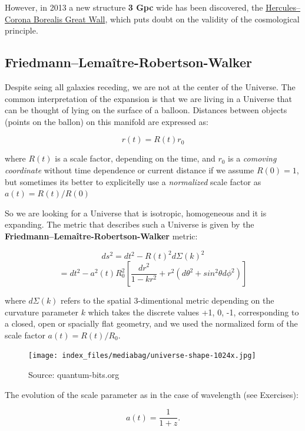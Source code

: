 \documentclass[
  letterpaper,
  DIV=11,
  numbers=noendperiod]{scrreprt}
\begin{document}
However, in 2013 a new structure \textbf{3 Gpc} wide has been
discovered, the \href{http://arxiv.org/abs/1311.1104}{Hercules--Corona
Borealis Great Wall}, which puts doubt on the validity of the
cosmological principle.

\subsection{Friedmann--Lemaître-Robertson-Walker}\label{friedmannlemauxeetre-robertson-walker}

Despite seing all galaxies receding, we are not at the center of the
Universe. The common interpretation of the expansion is that we are
living in a Universe that can be thought of lying on the surface of a
balloon. Distances between objects (points on the ballon) on this
manifold are expressed as:

\[r(t) = R(t)r_0\]

where \(R(t)\) is a scale factor, depending on the time, and \(r_0\) is
a \emph{comoving coordinate} without time dependence or current distance
if we assume \(R(0) = 1\), but sometimes its better to explicitelly use
a \emph{normalized} scale factor as \(a(t) = R(t)/R(0)\)

So we are looking for a Universe that is isotropic, homogeneous and it
is expanding. The metric that describes such a Universe is given by the
\textbf{Friedmann--Lemaître-Robertson-Walker} metric:

\[ds^2 = dt^2 - R(t)^2 d \Sigma(k)^2 \]
\[= dt^2 - a^2(t)R^2_0\left[\frac{dr^2}{1 - kr^2} + r^2(d\theta^2  + sin^2\theta d\phi^2)\right]\]

where \(d\Sigma(k)\) refers to the spatial 3-dimentional metric
depending on the curvature parameter \(k\) which takes the discrete
values +1, 0, -1, corresponding to a closed, open or spacially flat
geometry, and we used the normalized form of the scale factor
\(a(t) = R(t)/R_0\).

\begin{figure}[H]

{\centering \texttt{[image: index\_files/mediabag/universe-shape-1024x.jpg]}

}

\caption{Source: quantum-bits.org}

\end{figure}%

The evolution of the scale parameter as in the case of wavelength (see
Exercises):

\[a(t) = \frac{1}{1+z}.\]
\end{document}
